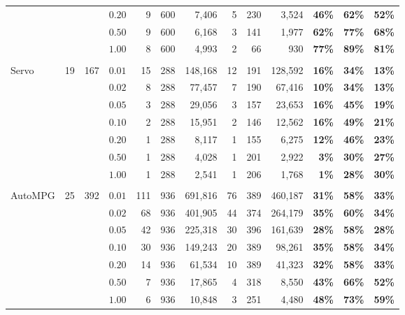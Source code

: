 \documentclass[ijoc,noblindrev]{informs3} %
\begin{document}
\begin{table}[h!]
\begin{center}
\begin{tabular}{l r r r|r r r | r r r  | r r r }
		&&&$0.20$&9&600&7,406&5&230&3,524&\textbf{46\%}&\textbf{62\%}&\textbf{52\%}\\
		&&&$0.50$&9&600&6,168&3&141&1,977&\textbf{62\%}&\textbf{77\%}&\textbf{68\%}\\
		&&&$1.00$&8&600&4,993&2&66&930&\textbf{77\%}&\textbf{89\%}&\textbf{81\%}\\
		&&&&&&&&&&&&\\
		\multirow{7}{*}{Servo}&\multirow{7}{*}{19}&\multirow{7}{*}{167}&
		$0.01$&15&288&148,168&12&191&128,592&\textbf{16\%}&\textbf{34\%}&\textbf{13\%}\\
		&&&$0.02$&8&288&77,457&7&190&67,416&\textbf{10\%}&\textbf{34\%}&\textbf{13\%}\\
		&&&$0.05$&3&288&29,056&3&157&23,653&\textbf{16\%}&\textbf{45\%}&\textbf{19\%}\\
		&&&$0.10$&2&288&15,951&2&146&12,562&\textbf{16\%}&\textbf{49\%}&\textbf{21\%}\\
		&&&$0.20$&1&288&8,117&1&155&6,275&\textbf{12\%}&\textbf{46\%}&\textbf{23\%}\\
		&&&$0.50$&1&288&4,028&1&201&2,922&\textbf{3\%}&\textbf{30\%}&\textbf{27\%}\\
		&&&$1.00$&1&288&2,541&1&206&1,768&\textbf{1\%}&\textbf{28\%}&\textbf{30\%}\\
			&&&&&&&&&&&&\\
		\multirow{7}{*}{AutoMPG}&\multirow{7}{*}{25}&\multirow{7}{*}{392}&
		$0.01$&111&936&691,816&76&389&460,187&\textbf{31\%}&\textbf{58\%}&\textbf{33\%}\\
		&&&$0.02$&68&936&401,905&44&374&264,179&\textbf{35\%}&\textbf{60\%}&\textbf{34\%}\\
		&&&$0.05$&42&936&225,318&30&396&161,639&\textbf{28\%}&\textbf{58\%}&\textbf{28\%}\\
		&&&$0.10$&30&936&149,243&20&389&98,261&\textbf{35\%}&\textbf{58\%}&\textbf{34\%}\\
		&&&$0.20$&14&936&61,534&10&389&41,323&\textbf{32\%}&\textbf{58\%}&\textbf{33\%}\\
		&&&$0.50$&7&936&17,865&4&318&8,550&\textbf{43\%}&\textbf{66\%}&\textbf{52\%}\\
		&&&$1.00$&6&936&10,848&3&251&4,480&\textbf{48\%}&\textbf{73\%}&\textbf{59\%}\\
		\hline
	\end{tabular}
    \end{center}
\end{table}
\end{document}
